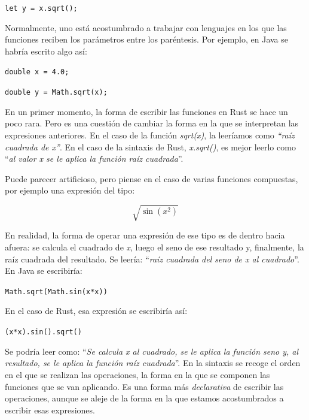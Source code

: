 {\vspace{-0.7em}\hspace{7em} \texttt{let y = x.sqrt();} \par}

Normalmente, uno está acostumbrado a trabajar con lenguajes en los que las funciones reciben los parámetros entre los paréntesis. Por ejemplo, en Java se habría escrito algo así:

{\hspace{7em} \texttt{double x = 4.0;} \par}

{\vspace{-0.7em}\hspace{7em} \texttt{double y = Math.sqrt(x);} \par}

En un primer momento, la forma de escribir las funciones en Rust se hace un poco rara. Pero es una cuestión de cambiar la forma en la que se interpretan las expresiones anteriores. En el caso de la función \textit{sqrt(x)}, la leeríamos como \textit{``raíz cuadrada de x''}. En el caso de la sintaxis de Rust, \textit{x.sqrt()}, es mejor leerlo como ``\textit{al valor x se le aplica la función raíz cuadrada}''. 

Puede parecer artificioso, pero piense en el caso de varias funciones compuestas, por ejemplo una expresión del tipo:

\[\sqrt{\sin{(x^2)}}\]

En realidad, la forma de operar una expresión de ese tipo es de dentro hacia afuera: se calcula el cuadrado de \textit{x}, luego el seno de ese resultado y, finalmente, la raíz cuadrada del resultado. Se leería: ``\textit{raíz cuadrada del seno de x al cuadrado}''. En Java se escribiría:

\vspace{0.3em}
{\centering \texttt{Math.sqrt(Math.sin(x*x))} \par}
\vspace{0.3em}

En el caso de Rust, esa expresión se escribiría así:

\vspace{0.3em}
{\centering \texttt{(x*x).sin().sqrt()} \par}
\vspace{0.3em}

Se podría leer como: ``\textit{Se calcula x al cuadrado, se le aplica la función seno y, al resultado, se le aplica la función raíz cuadrada}''. En la sintaxis se recoge el orden en el que se realizan las operaciones, la forma en la que se componen las funciones que se van aplicando. Es una forma más \textit{declarativa} de escribir las operaciones, aunque se aleje de la forma en la que estamos acostumbrados a escribir esas expresiones.


